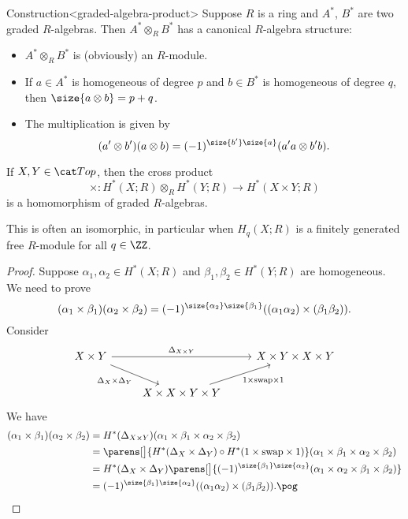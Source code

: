 \documentclass{standalone}
\begin{document}
\begin{adhoctheorem}{Construction}<graded-algebra-product>
  Suppose \(R\) is a ring and \(A^*\), \(B^*\) are two graded \(R\)-algebras.
  Then \(A^* \otimes_R B^*\) has a canonical \(R\)-algebra structure:
  \begin{itemize}[nosep]
    \item \(A^* \otimes_R B^*\) is (obviously) an \(R\)-module.
    \item If \(a \in A^*\) is homogeneous of degree \(p\) and
             \(b \in B^*\) is homogeneous of degree \(q\), then
          \(\size{a \otimes b} = p + q\).
    \item The multiplication is given by
          \[
            (a' \otimes b')(a \otimes b)
              = (-1)^{\size{b'} \size{a}}(a' a \otimes b' b).
          \]
  \end{itemize}
\end{adhoctheorem}

\begin{theorem}
  If \(X, Y \in \cTop\), then the cross product
  \[
    {\times} \colon H^*(X; R) \otimes_R H^*(Y; R) \to H^*(X \times Y; R)
  \]
  is a homomorphism of graded \(R\)-algebras.
\end{theorem}
This is often an isomorphic, in particular when \(H_q(X; R)\) is
a finitely generated free \(R\)-module for all \(q \in \ZZ\).

\begin{proof}
  Suppose \(\alpha_1, \alpha_2 \in H^*(X; R)\) and
          \(\beta_1, \beta_2 \in H^*(Y; R)\) are homogeneous.
  We need to prove
  \[
    (\alpha_1 \times \beta_1)(\alpha_2 \times \beta_2)
      = (-1)^{\size{\alpha_2} \size{\beta_1}}
        ((\alpha_1 \alpha_2) \times (\beta_1 \beta_2)).
  \]
  Consider
  \[
    \begin{tikzcd}
      X \times Y \ar[rr, "\Delta_{X \times Y}"]
                 \ar[dr, "\Delta_X \times \Delta_Y"'] &&
        X \times Y \times X \times Y \\
      & X \times X \times Y \times Y \ar[ur, "1 \times \text{swap} \times 1"']
    \end{tikzcd}
  \]
  We have
  \begin{align*}
    (\alpha_1 \times \beta_1)(\alpha_2 \times \beta_2)
      &= H^*(\Delta_{X \times Y})
           (\alpha_1 \times \beta_1 \times \alpha_2 \times \beta_2) \\
      &= \parens[\big]{H^*(\Delta_X \times \Delta_Y) \circ
                       H^*(1 \times \text{swap} \times 1)}
           (\alpha_1 \times \beta_1 \times \alpha_2 \times \beta_2) \\
      &= H^*(\Delta_X \times \Delta_Y) \parens[\big]{
           (-1)^{\size{\beta_1} \size{\alpha_2}}
           (\alpha_1 \times \alpha_2 \times \beta_1 \times \beta_2)} \\
      &= (-1)^{\size{\beta_1} \size{\alpha_2}}
           ((\alpha_1 \alpha_2) \times (\beta_1 \beta_2)). \pog
  \end{align*}
\end{proof}
\end{document}
